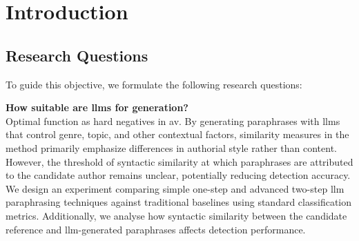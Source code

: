 \chapter{Introduction}
\label{chap:introduction}





\section{Research Questions}
\label{sec:research_questions}
To guide this objective, we formulate the following research questions:
\begin{questions}
    \item \textbf{How suitable are \acp{llm} for \imp{} generation?} \label{enum:rq1} \hfill \\
    Optimal \imps{} function as hard negatives in \ac{av}.
    By generating paraphrases with \acp{llm} that control genre, topic, and other contextual factors, similarity measures in the \imp{} method primarily emphasize differences in authorial style rather than content.
    However, the threshold of syntactic similarity at which paraphrases are attributed to the candidate author remains unclear, potentially reducing detection accuracy.
    We design an experiment comparing simple one-step and advanced two-step \ac{llm} paraphrasing techniques against traditional baselines using standard classification metrics.
    Additionally, we analyse how syntactic similarity between the candidate reference and \ac{llm}-generated paraphrases affects detection performance.


\end{questions}
